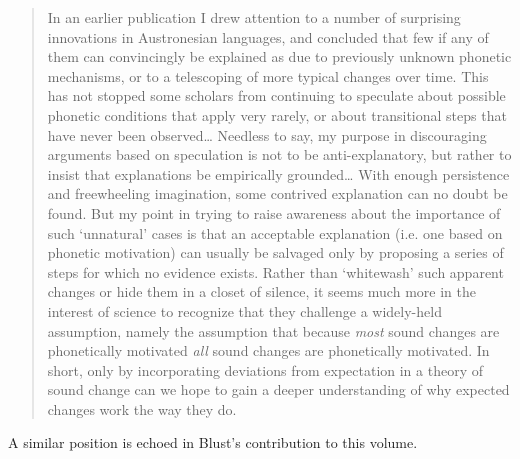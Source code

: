 \documentclass[output=paper]{langscibook}
\begin{document}
\begin{quote}
In an earlier publication \citep{Blust2005} I drew attention to a number of surprising innovations in Austronesian languages, and concluded that few if any of them can convincingly be explained as due to previously unknown phonetic mechanisms, or to a telescoping of more typical changes over time. This has not stopped some scholars from continuing to speculate about possible phonetic conditions that apply very rarely, or about transitional steps that have never been observed… Needless to say, my purpose in discouraging arguments based on speculation is not to be anti-explanatory, but rather to insist that explanations be empirically grounded… With enough persistence and freewheeling imagination, some contrived explanation can no doubt be found. But my point in trying to raise awareness about the importance of such ‘unnatural’ cases is that an acceptable explanation (i.e. one based on phonetic motivation) can usually be salvaged only by proposing a series of steps for which no evidence exists. Rather than ‘whitewash’ such apparent changes or hide them in a closet of silence, it seems much more in the interest of science to recognize that they challenge a widely-held assumption, namely the assumption that because \textit{most} sound changes are phonetically motivated \textit{all} sound changes are phonetically motivated. In short, only by incorporating deviations from expectation in a theory of sound change can we hope to gain a deeper understanding of why expected changes work the way they do.\hfill\hbox{\citep[1--2]{Blust2018}}
\end{quote}

A similar position is echoed in Blust’s contribution to this volume.
\end{document}
